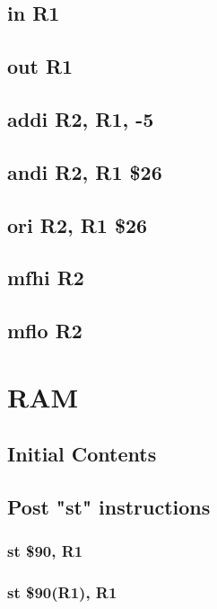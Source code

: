 \documentclass{article}
\begin{document}
    \subsection{in R1} \label{in_sequence}
        
    \subsection{out R1} \label{out_sequence}
        
    \subsection{addi R2, R1, -5} \label{addi_sequence}
        
    \subsection{andi R2, R1 \$26} \label{andi_sequence}
        
    \subsection{ori R2, R1 \$26} \label{ori_sequence}
        
    \subsection{mfhi R2} \label{mfhi_sequence}
        
    \subsection{mflo R2} \label{mflo_sequence}
        
\section{RAM}
    \subsection{Initial Contents} \label{ram_init}
    \subsection{Post "st" instructions}
        \subsubsection{st \$90, R1} \label{ram_st_case_1}
            
        \subsubsection{st \$90(R1), R1} \label{ram_st_case_2}
            
\end{document}
